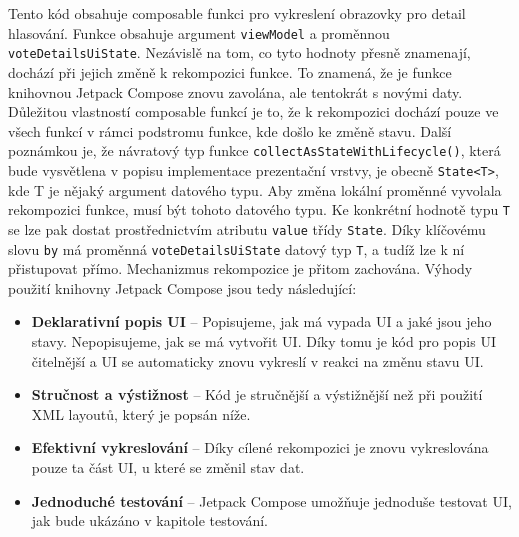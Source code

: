 \noindent Tento kód obsahuje composable funkci pro vykreslení obrazovky pro detail hlasování. Funkce obsahuje argument \lstinline|viewModel| a proměnnou \lstinline|voteDetailsUiState|. Nezávislě na tom, co tyto hodnoty přesně znamenají, dochází při jejich změně k rekompozici funkce. To znamená, že je funkce knihovnou Jetpack Compose znovu zavolána, ale tentokrát s novými daty. Důležitou vlastností composable funkcí je to, že k rekompozici dochází pouze ve všech funkcí v rámci podstromu \linebreak funkce, kde došlo ke změně stavu. Další poznámkou je, že návratový typ funkce \linebreak \lstinline|collectAsStateWithLifecycle()|, která bude vysvětlena v popisu implementace prezentační \linebreak vrstvy, je obecně \lstinline|State<T>|, kde T je nějaký argument datového typu. Aby změna lokální proměnné vyvolala rekompozici funkce, musí být tohoto datového typu. Ke konkrétní hodnotě typu \lstinline|T| se lze pak dostat prostřednictvím atributu \lstinline|value| třídy \lstinline|State|. Díky klíčovému slovu \lstinline|by| má proměnná \lstinline|voteDetailsUiState| datový typ \lstinline|T|, a tudíž lze k ní přistupovat přímo. Mechanizmus rekompozice je přitom zachována. Výhody použití knihovny Jetpack Compose jsou tedy následující:

\begin{itemize}
	\item \textbf{Deklarativní popis UI} -- Popisujeme, jak má vypada UI a jaké jsou jeho stavy. Nepopisujeme, jak se má vytvořit UI. Díky tomu je kód pro popis UI čitelnější a UI se automaticky znovu vykreslí v reakci na změnu stavu UI.
	
	\item \textbf{Stručnost a výstižnost} -- Kód je stručnější a výstižnější než při použití XML layoutů, který je popsán níže.
	
	\item \textbf{Efektivní vykreslování} -- Díky cílené rekompozici je znovu vykreslována pouze ta část \linebreak UI, u které se změnil stav dat.
	
	\item \textbf{Jednoduché testování} -- Jetpack Compose umožňuje jednoduše testovat UI, jak bude ukázáno v kapitole testování.
\end{itemize}

